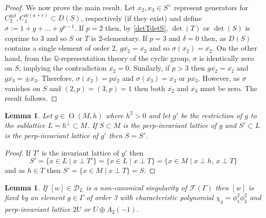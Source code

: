 \documentclass[12pt, a4paper]{article}
\newtheorem{lemma}[thm]{Lemma}
\newcommand{\QQ}{\mathbb{Q}}
\newcommand{\dc}{\mathcal{D}}
\newcommand{\fc}{\mathcal{F}}
\newcommand{\opn}{\operatorname}
\newcommand{\op}{\oplus}
\begin{document}
\begin{proof}
We now prove the main result.
Let $x_2, x_3 \in S^{\vee}$ represent generators for $C_2^{\op \delta}, C_3^{\op (a + \epsilon)} \subset D(S)$, respectively (if they exist) and define $\sigma:=1 + g + \ldots + g^{p-1}$.  
If $p=2$ then, by \eqref{detTdetS}, $\opn{det}(T)$ or $\opn{det}(S)$ is coprime to 3 and so $S$ or $T$ is $2$-elementary.
If $p=3$ and $\delta=0$ then, as $D(S)$ contains a single element of order 2, $g \overline{x_2} = \overline{x_2}$ and so $\sigma(\overline{x_2}) = \overline{x_2}$.
On the other hand, from the $\QQ$-representation theory of the cyclic group, $\sigma$ is identically zero on $S$, implying the contradiction $\overline{x_2}=0$.
Similarly, if $p>3$ then $g \overline{x_2} = \overline{x_2}$ and $g \overline{x_3} = \pm \overline{x_3}$.
Therefore, $\sigma(\overline{x_2})=p \overline{x_2}$ and $\sigma(\overline{x_3}) = \overline{x_3}$ or $p\overline{x_3}$.
However, as $\sigma$ vanishes on $S$ and $(2,p)=(3,p)=1$ then both $\overline{x_2}$ and $\overline{x_3}$ must be zero.
The result follows.
\end{proof}
\begin{lemma}\label{perpinvrest}
  Let $g \in \opn{O}(M, h)$ where $h^2>0$ and let $g'$ be the restriction of $g$ to the sublattice $L=h^{\perp} \subset M$.
  If $S \subset M$ is the perp-invariant lattice of $g$ and $S' \subset L$ is the perp-invariant lattice of $g'$ then $S=S'$.
\end{lemma}
\begin{proof}
  If $T'$ is the invariant lattice of $g'$ then
\[
  S'
     = \{ x \in L \mid x \perp T' \} 
     = \{x \in L \mid x \perp T \} 
     = \{ x \in M \mid \text{$x \perp h$, $x \perp T$} \}
\]
and as $h \in T$ then 
$
S '
= \{ x \in M \mid x \perp T \} 
= S.
$
\end{proof}
\begin{lemma}\label{noncanonS}
  If $[w] \in \dc_L$ is a non-canonical singularity of $\fc(\Gamma)$ then $[w]$ is fixed by an element $g \in \Gamma$ of order 3 with characteristic polynomial $\chi_g = \phi_1^2 \phi_3^2$
  and perp-invariant lattice $2U$ or $U \op A_2(-1)$.   
\end{lemma}
\end{document}
